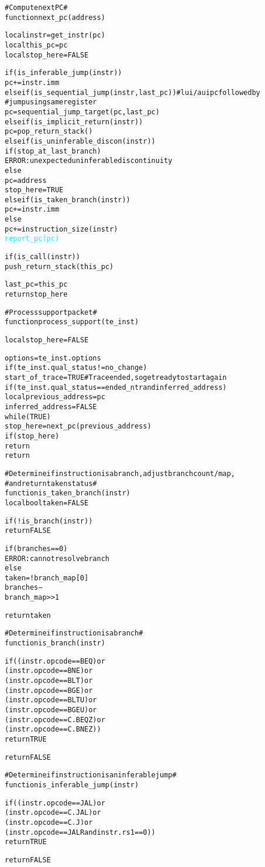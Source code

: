 \begin{alltt}
# Compute next PC #
function next_pc (address)

  local instr     = get_instr(pc)
  local this_pc   = pc
  local stop_here = FALSE

  if (is_inferable_jump(instr))
    pc += instr.imm
  else if (is_sequential_jump(instr, last_pc)) # lui/auipc followed by
                                               #  jump using same register
    pc = sequential_jump_target(pc, last_pc)
  else if (is_implicit_return(instr))
    pc = pop_return_stack()
  else if (is_uninferable_discon(instr))
    if (stop_at_last_branch)
      ERROR: unexpected uninferable discontinuity
    else
      pc        = address
      stop_here = TRUE
  else if (is_taken_branch(instr))
    pc += instr.imm
  else
    pc += instruction_size(instr)
  \textcolor{cyan}{report_pc(pc)}

  if (is_call(instr))
    push_return_stack(this_pc)

  last_pc = this_pc
  return stop_here

# Process support packet #
function process_support (te_inst)

  local stop_here = FALSE

  options = te_inst.options
    if (te_inst.qual_status != no_change)
      start_of_trace = TRUE # Trace ended, so get ready to start again
    if (te_inst.qual_status == ended_ntr and inferred_address)
      local previous_address = pc
      inferred_address       = FALSE
      while (TRUE)
        stop_here = next_pc(previous_address)
        if (stop_here)
          return
    return
\end{alltt}

\pagebreak

\begin{alltt}
# Determine if instruction is a branch, adjust branch count/map,
#   and return taken status #
function is_taken_branch (instr)
  local bool taken = FALSE

  if (!is_branch(instr))
    return FALSE

  if (branches == 0)
    ERROR: cannot resolve branch
  else
    taken = !branch_map[0]
    branches--
    branch_map >> 1

  return taken

# Determine if instruction is a branch #
function is_branch (instr)

  if ((instr.opcode == BEQ)    or
      (instr.opcode == BNE)    or
      (instr.opcode == BLT)    or
      (instr.opcode == BGE)    or
      (instr.opcode == BLTU)   or
      (instr.opcode == BGEU)   or
      (instr.opcode == C.BEQZ) or
      (instr.opcode == C.BNEZ))
    return TRUE

  return FALSE

# Determine if instruction is an inferable jump #
function is_inferable_jump (instr)

  if ((instr.opcode == JAL)   or
      (instr.opcode == C.JAL) or
      (instr.opcode == C.J)   or
      (instr.opcode == JALR and instr.rs1 == 0))
    return TRUE

  return FALSE
\end{alltt}

